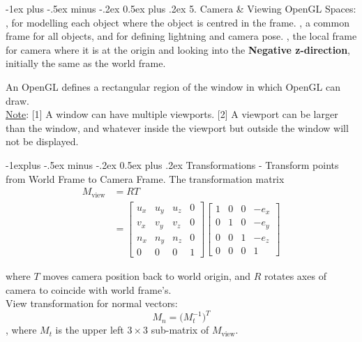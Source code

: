 \documentclass[10pt,landscape,letterpaper]{article}
\makeatletter
\renewcommand{\section}{\@startsection{section}{1}{0mm}%
                                {-1ex plus -.5ex minus -.2ex}%
                                {0.5ex plus .2ex}%
                                {\sffamily\large}}
\renewcommand{\subsection}{\@startsection{subsection}{2}{0mm}%
                                {-1explus -.5ex minus -.2ex}%
                                {0.5ex plus .2ex}%
                                {\sffamily\normalsize\itshape}}
\makeatother
\begin{document}
\begin{multicols}{3}
\section{5. Camera \& Viewing}
OpenGL Spaces: , for modelling each object where the object is centred in the frame. , a common frame for all objects, and for defining lightning and camera pose. , the local frame for camera where it is at the origin and looking into the \textbf{Negative z-direction}, initially the same as the world frame.

\smallskip

An OpenGL  defines a rectangular region of the window in which OpenGL can draw.
\\
\underline{Note}: [1] A window can have multiple viewports. [2] A viewport can be larger than the window, and whatever inside the viewport but outside the window will not be displayed.


\subsection{Transformations}
 - Transform points from World Frame to Camera Frame. The transformation matrix
\[
\begin{aligned}
M_\text{view} 
&= RT
\\
&= 
\begin{bmatrix}
u_x     & u_y   & u_z   & 0     \\
v_x     & v_y   & v_z   & 0     \\
n_x     & n_y   & n_z   & 0     \\
0       & 0     & 0     & 1     
\end{bmatrix}
\begin{bmatrix}
1       & 0     & 0     & -e_x  \\
0       & 1     & 0     & -e_y  \\
0       & 0     & 1     & -e_z  \\
0       & 0     & 0     & 1
\end{bmatrix}
\end{aligned}
\]

where $T$ moves camera position back to world origin, and $R$ rotates axes of camera to coincide with world frame's.
\\
View transformation for normal vectors:
\[
M_n = \big( M_t^{-1} \big)^T
\]
, where $M_t$ is the upper left $3 \times 3$ sub-matrix of $M_\text{view}$.


\end{multicols}
\end{document}
